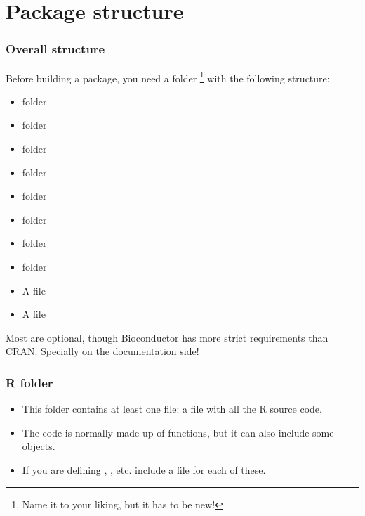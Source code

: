 \section{Package structure}

\begin{frame}[allowframebreaks]
  \frametitle{Overall structure}
  Before building a package, you need a folder \footnote{Name it to your liking, but it has to be new!} with the following structure:
  \begin{itemize}
  \item {} folder
  \item {} folder
  \item {} folder
  \item {} folder
  \item {} folder
  \item {} folder
  \item {} folder
  \item {} folder
  \item A  file
  \item A  file
  \end{itemize}
  Most are \alert{optional}, though Bioconductor has more strict requirements than CRAN. Specially on the documentation side!
\end{frame}

\begin{frame}[allowframebreaks]
  \frametitle{R folder}
  \begin{itemize}
  \item This folder contains at least one file: a  file with all the R source code.
  \item The code is normally made up of functions, but it can also include some objects.
  \item If you are defining , , etc. include a  file for each of these.
  \end{itemize}
\end{frame}

